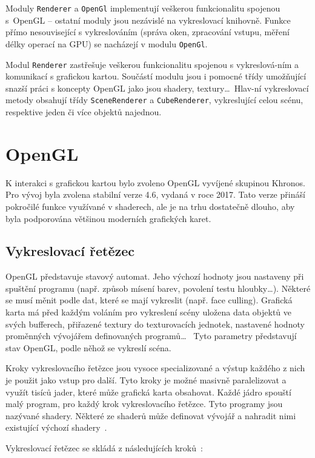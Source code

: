 \documentclass[thesis=M,czech]{FITthesis}[2019/12/23]
\begin{document}
Moduly \texttt{Renderer} a \texttt{OpenGl} implementují veškerou funkcionalitu spojenou s~OpenGL -- ostatní moduly jsou nezávislé na vykreslovací knihovně. Funkce přímo nesouvisející s vykreslováním (správa oken, zpracování vstupu, měření délky operací na GPU) se nacházejí v modulu \texttt{OpenGl}.

Modul \texttt{Renderer} zastřešuje veškerou funkcionalitu spojenou s vykreslová-ním a komunikací s grafickou kartou. Součástí modulu jsou i pomocné třídy umožňující snazší práci s koncepty OpenGL jako jsou shadery, textury\dots ~Hlav-ní vykreslovací metody obsahují třídy \texttt{SceneRenderer} a \texttt{CubeRenderer}, vykreslující celou scénu, respektive jeden či více objektů najednou.


\section{OpenGL}
K interakci s grafickou kartou bylo zvoleno OpenGL vyvíjené skupinou Khronos. Pro vývoj byla zvolena stabilní verze 4.6, vydaná v roce 2017. Tato verze přináší pokročilé funkce využívané v shaderech, ale je na trhu dostatečně dlouho, aby byla podporována většinou moderních grafických karet.

\subsection{Vykreslovací řetězec}
OpenGL představuje stavový automat. Jeho výchozí hodnoty jsou nastaveny při spuštění programu (např. způsob mísení barev, povolení testu hloubky\dots). Některé se musí měnit podle dat, které se mají vykreslit (např. face culling). Grafická karta má před každým voláním pro vykreslení scény uložena data objektů ve svých bufferech, přiřazené textury do texturovacích jednotek, nastavené hodnoty proměnných vývojářem definovaných programů\dots~ Tyto parametry představují stav OpenGL, podle něhož se vykreslí scéna.

Kroky vykreslovacího řetězce jsou vysoce specializované a výstup každého z nich je použit jako vstup pro další. Tyto kroky je možné masivně paralelizovat a využít tisíců jader, které může grafická karta obsahovat. Každé jádro spouští malý program, pro každý krok vykreslovacího řetězce. Tyto programy jsou nazývané shadery. Některé ze shaderů může definovat vývojář a nahradit nimi existující výchozí shadery~\cite{lopgl_triangle}.

Vykreslovací řetězec se skládá z následujících kroků~\cite{kronos_render}: 
\end{document}
